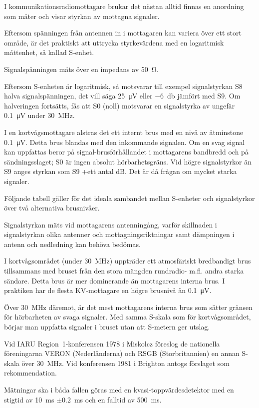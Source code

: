 \noindent
I kommunikationsradiomottagare brukar det nästan alltid finnas en anordning som
mäter och visar styrkan av mottagna signaler.

Eftersom spänningen från antennen in i mottagaren kan variera över ett stort
område, är det praktiskt att uttrycka styrkevärdena med en logaritmisk
måttenhet, så kallad S-enhet.

Signalspänningen mäts över en impedans av \qty{50}{\ohm}.

Eftersom S-enheten är logaritmisk, så motsvarar till exempel signalstyrkan S8
halva signalspänningen, det vill säga \qty{25}{\micro\volt} eller
\qty{-6}{\decibel} jämfört med S9.
Om halveringen fortsätts, fås att S0 (noll) motsvarar en signalstyrka av
ungefär \qty{0,1}{\micro\volt} under \qty{30}{\mega\hertz}.

I en kortvågsmottagare alstras det ett internt brus med en nivå av
åtminstone \qty{0,1}{\micro\volt}.
Detta brus blandas med den inkommande signalen.
Om en svag signal kan uppfattas beror på signal-brusförhållandet i mottagarens
bandbredd och på sändningsslaget; S0 är ingen absolut hörbarhetsgräns.
Vid högre signalstyrkor än S9 anges styrkan som S9 +ett antal dB.
Det är då frågan om mycket starka signaler.

Följande tabell gäller för det ideala sambandet mellan S-enheter och
signalstyrkor över två alternativa brusnivåer.

Signalstyrkan mäts vid mottagarens antenningång, varför skillnaden i
signalstyrkan olika antenner och mottagningsriktningar samt dämpningen
i antenn och nedledning kan behöva bedömas.

I kortvågsområdet (under \qty{30}{\mega\hertz}) uppträder ett atmosfäriskt
bredbandigt brus tillsammans med bruset från den stora mängden rundradio- m.fl.
andra starka sändare.
Detta brus är mer dominerande än mottagarens interna brus.
I praktiken har de flesta KV-mottagare en högre brusnivå än
\qty{0,1}{\micro\volt}.

Över \qty{30}{\mega\hertz} däremot, är det mest mottagarens interna brus som
sätter gränsen för hörbarheten av svaga signaler.
Med samma S-skala som för kortvågsområdet, börjar man uppfatta signaler i
bruset utan att S-metern ger utslag.

Vid IARU Region~1-konferensen 1978 i Miskolcz föreslog de nationella
föreningarna VERON (Nederländerna) och RSGB (Storbritannien) en annan
S-skala över \qty{30}{\mega\hertz}.
Vid konferensen 1981 i Brighton antogs förslaget som rekommendation.

Mätningar ska i båda fallen göras med en kvasi-toppvärdesdetektor med en stigtid
av \qty{10}{\milli\second} \(\pm\)\qty{0,2}{\milli\second} och en falltid av
\qty{500}{\milli\second}.
